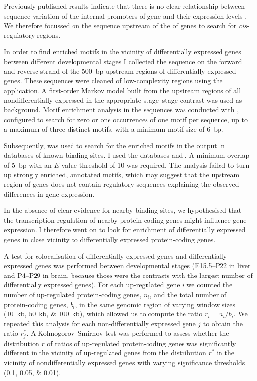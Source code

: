 Previously published results indicate that there is no clear relationship
between sequence variation of the internal promoters of \trna gene and their
expression levels \citep{Oler:2010,Canella:2012}. We therefore focussed on the
sequence upstream of the \tss of \trna genes to search for \emph{cis}-regulatory
regions.

In order to find enriched motifs in the vicinity of differentially expressed
\trna genes between different developmental stages I collected the sequence on
the forward and reverse strand of the \SI{500}{bp} upstream regions of
differentially expressed \trna genes. These sequences were cleaned of
low-complexity regions using the  application. A first-order Markov
model built from the upstream regions of all nondifferentially expressed
\trna[s] in the appropriate stage–stage contrast was used as background. Motif
enrichment analysis in the sequences was conducted with 
\citep{Bailey:2009}, configured to search for zero or one occurrences of one
motif per sequence, up to a maximum of three distinct motifs, with a minimum
motif size of \SI{6}{bp}.

Subsequently,  \citep{Gupta:2007} was used to search for the
enriched motifs in the  output in databases of known \tf binding
sites. I used the databases  and
. A minimum overlap of \SI{5}{bp} with an
\(E\)-value threshold of \num{10} was required. The analysis failed to turn up
strongly enriched, annotated motifs, which may suggest that the upstream region
of \trna genes does not contain regulatory sequences explaining the observed
differences in \trna gene expression.

In the absence of clear evidence for nearby \tf binding sites, we hypothesised
that the transcription regulation of nearby protein-coding genes might influence
\trna gene expression. I therefore went on to look for enrichment of
differentially expressed \trna genes in close vicinity to differentially
expressed protein-coding genes.

A test for colocalisation of differentially expressed \trna genes and
differentially expressed \mrna genes was performed between developmental stages
(E15.5–P22 in liver and P4–P29 in brain, because those were the contrasts with
the largest number of differentially expressed \trna genes). For each
up-regulated \trna gene \(i\) we counted the number of up-regulated
protein-coding genes, \(n_i\), and the total number of protein-coding genes,
\(b_i\), in the same genomic region of varying window sizes
(\SIlist{10;50;100}{kb}), which allowed us to compute the ratio \(r_i =
{n_i}/{b_i}\). We repeated this analysis for each non-differentially expressed
\trna gene \(j\) to obtain the ratio \(r_j^*\). A Kolmogorov–Smirnov test was
performed to assess whether the distribution \(r\) of ratios of up-regulated
protein-coding genes was significantly different in the vicinity of up-regulated
\trna genes from the distribution \(r^*\) in the vicinity of nondifferentially
expressed \trna genes with varying significance thresholds
(\numlist{0.1;0.05;0.01}).

